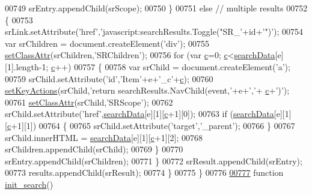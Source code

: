\begin{DoxyCode}
00749       srEntry.appendChild(srScope);
00750     \}
00751     \textcolor{keywordflow}{else} \textcolor{comment}{// multiple results}
00752     \{
00753       srLink.setAttribute(\textcolor{stringliteral}{'href'},\textcolor{stringliteral}{'javascript:searchResults.Toggle("SR\_'}+\textcolor{keywordtype}{id}+\textcolor{stringliteral}{'")'});
00754       var srChildren = document.createElement(\textcolor{stringliteral}{'div'});
00755       \hyperlink{search_8js_a499422fc054a5278ae32801ec0082c56}{setClassAttr}(srChildren,\textcolor{stringliteral}{'SRChildren'});
00756       \textcolor{keywordflow}{for} (var \hyperlink{jquery_8js_ad171626e81625b5e9f5cb177a3a8fb1c}{c}=0; \hyperlink{jquery_8js_ad171626e81625b5e9f5cb177a3a8fb1c}{c}<\hyperlink{all__0_8js_ad01a7523f103d6242ef9b0451861231e}{searchData}[e][1].length-1; \hyperlink{jquery_8js_ad171626e81625b5e9f5cb177a3a8fb1c}{c}++)
00757       \{
00758         var srChild = document.createElement(\textcolor{charliteral}{'a'});
00759         srChild.setAttribute(\textcolor{stringliteral}{'id'},\textcolor{stringliteral}{'Item'}+e+\textcolor{stringliteral}{'\_c'}+\hyperlink{jquery_8js_ad171626e81625b5e9f5cb177a3a8fb1c}{c});
00760         \hyperlink{search_8js_a98192fa2929bb8e4b0a890a4909ab9b2}{setKeyActions}(srChild,\textcolor{stringliteral}{'return searchResults.NavChild(event,'}+e+\textcolor{charliteral}{','}+
      \hyperlink{jquery_8js_ad171626e81625b5e9f5cb177a3a8fb1c}{c}+\textcolor{charliteral}{')'});
00761         \hyperlink{search_8js_a499422fc054a5278ae32801ec0082c56}{setClassAttr}(srChild,\textcolor{stringliteral}{'SRScope'});
00762         srChild.setAttribute(\textcolor{stringliteral}{'href'},\hyperlink{all__0_8js_ad01a7523f103d6242ef9b0451861231e}{searchData}[e][1][\hyperlink{jquery_8js_ad171626e81625b5e9f5cb177a3a8fb1c}{c}+1][0]);
00763         \textcolor{keywordflow}{if} (\hyperlink{all__0_8js_ad01a7523f103d6242ef9b0451861231e}{searchData}[e][1][\hyperlink{jquery_8js_ad171626e81625b5e9f5cb177a3a8fb1c}{c}+1][1])
00764         \{
00765          srChild.setAttribute(\textcolor{stringliteral}{'target'},\textcolor{stringliteral}{'\_parent'});
00766         \}
00767         srChild.innerHTML = \hyperlink{all__0_8js_ad01a7523f103d6242ef9b0451861231e}{searchData}[e][1][\hyperlink{jquery_8js_ad171626e81625b5e9f5cb177a3a8fb1c}{c}+1][2];
00768         srChildren.appendChild(srChild);
00769       \}
00770       srEntry.appendChild(srChildren);
00771     \}
00772     srResult.appendChild(srEntry);
00773     results.appendChild(srResult);
00774   \}
00775 \}
00776 
\hypertarget{search_8js_source.tex_l00777}{}\hyperlink{search_8js_ae95ec7d5d450d0a8d6928a594798aaf4}{00777} \textcolor{keyword}{function} \hyperlink{search_8js_ae95ec7d5d450d0a8d6928a594798aaf4}{init\_search}()

\end{DoxyCode}
